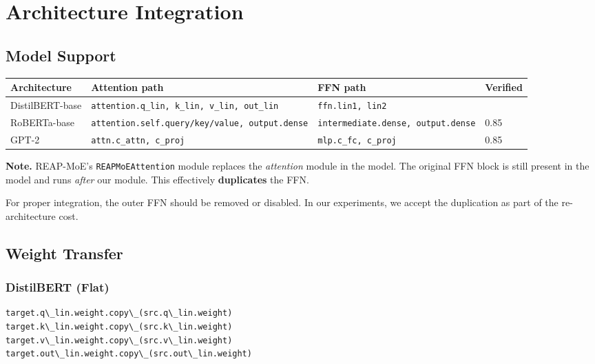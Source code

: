 \section{Architecture Integration}

\subsection{Model Support}

\begin{table}[H]
\centering
\small
\begin{tabular}{llll}
\toprule
\textbf{Architecture} & \textbf{Attention path} & \textbf{FFN path} & \textbf{Verified} \\
\midrule
DistilBERT-base & \texttt{attention.q\_lin, k\_lin, v\_lin, out\_lin} & \texttt{ffn.lin1, lin2} &  \\
RoBERTa-base & \texttt{attention.self.query/key/value, output.dense} & \texttt{intermediate.dense, output.dense} & 0.85 \\
GPT-2 & \texttt{attn.c\_attn, c\_proj} & \texttt{mlp.c\_fc, c\_proj} & 0.85 \\
\bottomrule
\end{tabular}
\end{table}

\textbf{Note.} REAP-MoE's \texttt{REAPMoEAttention} module replaces the \textit{attention} 
module in the model. The original FFN block is still present in the model 
and runs \textit{after} our module. This effectively \textbf{duplicates} the FFN.

For proper integration, the outer FFN should be removed or disabled. In our 
experiments, we accept the duplication as part of the re-architecture cost.

\subsection{Weight Transfer}

\subsubsection{DistilBERT (Flat)}

\begin{lstlisting}
target.q\_lin.weight.copy\_(src.q\_lin.weight)
target.k\_lin.weight.copy\_(src.k\_lin.weight)
target.v\_lin.weight.copy\_(src.v\_lin.weight)
target.out\_lin.weight.copy\_(src.out\_lin.weight)
\end{lstlisting}

